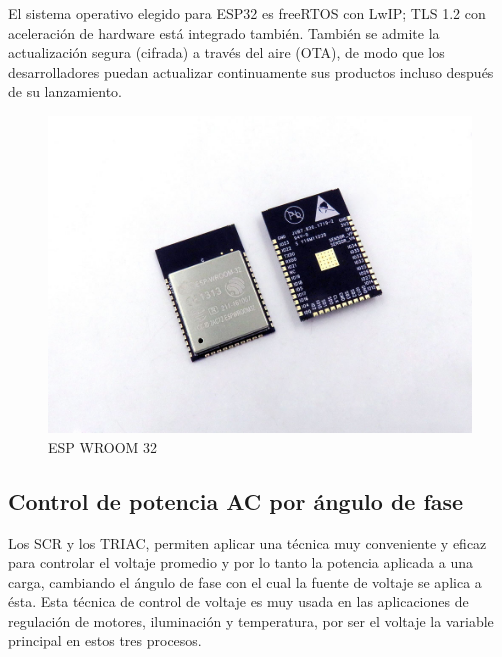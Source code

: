 El sistema operativo elegido para ESP32 es freeRTOS con LwIP; TLS 1.2 con aceleración de hardware está integrado también. También se admite la actualización segura (cifrada) a través del aire (OTA), de modo que los desarrolladores puedan actualizar continuamente sus productos incluso después de su lanzamiento.\cite{EW32}  \\


\begin{figure}
	\centering
	\caption{ESP WROOM 32}
	\label{fig:esp32-wroom-s32-00}
	\includegraphics{Imagenes/esp32-wroom-s32-00}
\end{figure}



\subsection{Control de potencia AC por ángulo de fase}



Los SCR y los TRIAC, permiten aplicar una técnica muy conveniente y eficaz para controlar el voltaje promedio y por lo tanto la potencia aplicada a una carga, cambiando el ángulo de fase con el cual la fuente de voltaje se aplica a ésta. Esta técnica de control de voltaje es muy usada en las aplicaciones de regulación de motores, iluminación y temperatura, por ser el voltaje la variable principal en estos tres procesos.\\

